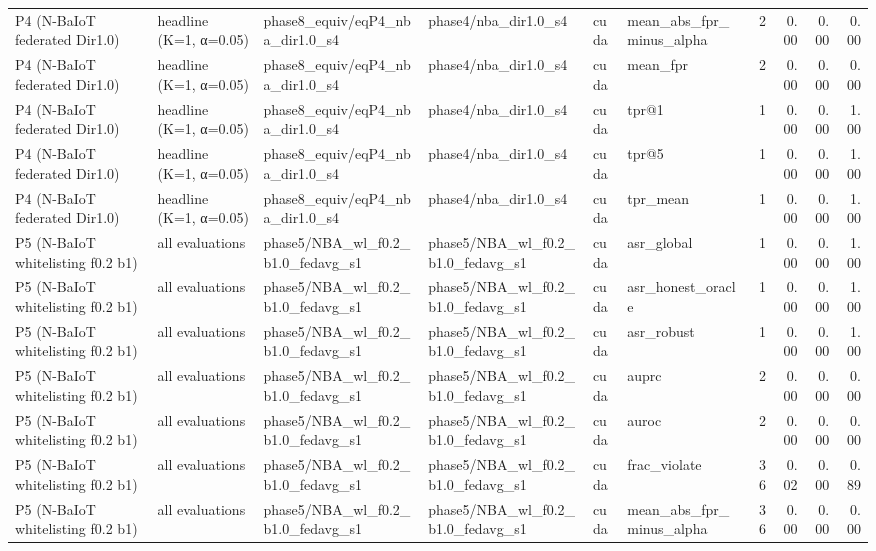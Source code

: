 \begin{tabular}{llllllrrrr}
P4 (N-BaIoT federated Dir1.0) & headline (K=1, α=0.05) & phase8\_equiv/eqP4\_nba\_dir1.0\_s4 & phase4/nba\_dir1.0\_s4 & cuda & mean\_abs\_fpr\_minus\_alpha & 2 & 0.00 & 0.00 & 0.00 \\
P4 (N-BaIoT federated Dir1.0) & headline (K=1, α=0.05) & phase8\_equiv/eqP4\_nba\_dir1.0\_s4 & phase4/nba\_dir1.0\_s4 & cuda & mean\_fpr & 2 & 0.00 & 0.00 & 0.00 \\
P4 (N-BaIoT federated Dir1.0) & headline (K=1, α=0.05) & phase8\_equiv/eqP4\_nba\_dir1.0\_s4 & phase4/nba\_dir1.0\_s4 & cuda & tpr@1 & 1 & 0.00 & 0.00 & 1.00 \\
P4 (N-BaIoT federated Dir1.0) & headline (K=1, α=0.05) & phase8\_equiv/eqP4\_nba\_dir1.0\_s4 & phase4/nba\_dir1.0\_s4 & cuda & tpr@5 & 1 & 0.00 & 0.00 & 1.00 \\
P4 (N-BaIoT federated Dir1.0) & headline (K=1, α=0.05) & phase8\_equiv/eqP4\_nba\_dir1.0\_s4 & phase4/nba\_dir1.0\_s4 & cuda & tpr\_mean & 1 & 0.00 & 0.00 & 1.00 \\
P5 (N-BaIoT whitelisting f0.2 b1) & all evaluations & phase5/NBA\_wl\_f0.2\_b1.0\_fedavg\_s1 & phase5/NBA\_wl\_f0.2\_b1.0\_fedavg\_s1 & cuda & asr\_global & 1 & 0.00 & 0.00 & 1.00 \\
P5 (N-BaIoT whitelisting f0.2 b1) & all evaluations & phase5/NBA\_wl\_f0.2\_b1.0\_fedavg\_s1 & phase5/NBA\_wl\_f0.2\_b1.0\_fedavg\_s1 & cuda & asr\_honest\_oracle & 1 & 0.00 & 0.00 & 1.00 \\
P5 (N-BaIoT whitelisting f0.2 b1) & all evaluations & phase5/NBA\_wl\_f0.2\_b1.0\_fedavg\_s1 & phase5/NBA\_wl\_f0.2\_b1.0\_fedavg\_s1 & cuda & asr\_robust & 1 & 0.00 & 0.00 & 1.00 \\
P5 (N-BaIoT whitelisting f0.2 b1) & all evaluations & phase5/NBA\_wl\_f0.2\_b1.0\_fedavg\_s1 & phase5/NBA\_wl\_f0.2\_b1.0\_fedavg\_s1 & cuda & auprc & 2 & 0.00 & 0.00 & 0.00 \\
P5 (N-BaIoT whitelisting f0.2 b1) & all evaluations & phase5/NBA\_wl\_f0.2\_b1.0\_fedavg\_s1 & phase5/NBA\_wl\_f0.2\_b1.0\_fedavg\_s1 & cuda & auroc & 2 & 0.00 & 0.00 & 0.00 \\
P5 (N-BaIoT whitelisting f0.2 b1) & all evaluations & phase5/NBA\_wl\_f0.2\_b1.0\_fedavg\_s1 & phase5/NBA\_wl\_f0.2\_b1.0\_fedavg\_s1 & cuda & frac\_violate & 36 & 0.02 & 0.00 & 0.89 \\
P5 (N-BaIoT whitelisting f0.2 b1) & all evaluations & phase5/NBA\_wl\_f0.2\_b1.0\_fedavg\_s1 & phase5/NBA\_wl\_f0.2\_b1.0\_fedavg\_s1 & cuda & mean\_abs\_fpr\_minus\_alpha & 36 & 0.00 & 0.00 & 0.00 \\

\end{tabular}
